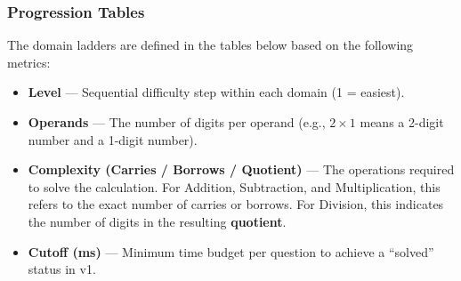 \documentclass[11pt]{article}
\begin{document}
\subsubsection*{Progression Tables}
The domain ladders are defined in the tables below based on the following metrics:
\begin{itemize}[leftmargin=*]
  \item \textbf{Level} --- Sequential difficulty step within each domain (1 = easiest).
  \item \textbf{Operands} --- The number of digits per operand (e.g., $2 \times 1$ means a 2-digit number and a 1-digit number).
  \item \textbf{Complexity (Carries / Borrows / Quotient)} --- The operations required to solve the calculation. For Addition, Subtraction, and Multiplication, this refers to the exact number of carries or borrows. For Division, this indicates the number of digits in the resulting \textbf{quotient}.
  \item \textbf{Cutoff (ms)} --- Minimum time budget per question to achieve a ``solved'' status in v1.
\end{itemize}

\vspace{1em}
\end{document}
